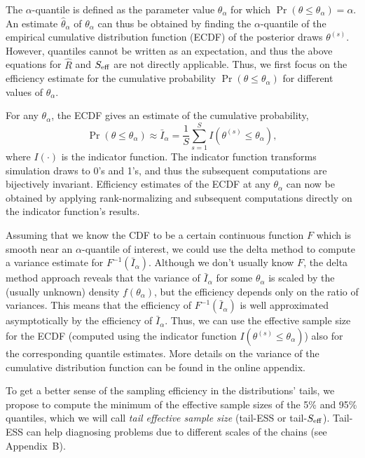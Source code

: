 \documentclass[american,]{article}
\theoremstyle{definition}
\begin{document}
The \(\alpha\)-quantile
is defined as the parameter value \(\theta_\alpha\) for which
\(\Pr(\theta \leq \theta_\alpha) = \alpha\). An estimate
\(\hat{\theta}_\alpha\) of \(\theta_\alpha\) can thus be obtained by
finding the \(\alpha\)-quantile of the empirical cumulative distribution function (ECDF) of the
posterior draws \(\theta^{(s)}\). However, quantiles cannot be written
as an expectation, and thus the above equations for \(\widehat{R}\) and
\(S_{\rm eff}\) are not directly applicable. Thus, we first focus on the
efficiency estimate for the cumulative probability
\(\Pr(\theta \leq \theta_\alpha)\) for different values of
\(\theta_\alpha\).

For any \(\theta_\alpha\), the ECDF gives an estimate of the cumulative
probability,
\begin{equation}
\Pr(\theta \leq \theta_\alpha) \approx \bar{I}_\alpha = \frac{1}{S}\sum_{s=1}^S
I(\theta^{(s)} \leq\theta_\alpha),
\end{equation}
where \(I(\cdot)\) is the indicator function. The indicator function
transforms simulation draws to 0's and 1's, and thus the subsequent
computations are bijectively invariant. Efficiency estimates of the ECDF
at any \(\theta_\alpha\) can now be obtained by applying
rank-normalizing and subsequent computations directly on the indicator
function's results.

Assuming that we know the CDF to be a certain continuous function \(F\)
which is smooth near an \(\alpha\)-quantile of interest, we could use
the delta method to compute a variance estimate for
\(F^{-1}(\bar{I}_\alpha)\). Although we don't usually know \(F\), the
delta method approach reveals that the variance of \(\bar{I}_\alpha\)
for some \(\theta_\alpha\) is scaled by the (usually unknown) density
\(f(\theta_\alpha)\), but the efficiency depends only on the ratio of variances. This means that the efficiency of \(F^{-1}(\bar{I}_\alpha)\) is well approximated asymptotically by the  efficiency
of \(\bar{I}_\alpha\). Thus, we can use the effective sample size for
the ECDF (computed using the indicator function
\(I(\theta^{(s)} \leq \theta_\alpha)\)) also for the corresponding
quantile estimates. More details on the variance of the cumulative
distribution function can be found in the online appendix.

To get a better sense of the sampling efficiency in the
distributions' tails, we propose to compute the minimum of the effective
sample sizes of the 5\% and 95\% quantiles, which we will call
\emph{tail effective sample size} (tail-ESS or tail-\(S_{\rm eff}\)).
Tail-ESS can help diagnosing problems due to different scales of the
chains (see Appendix~B).
\end{document}
